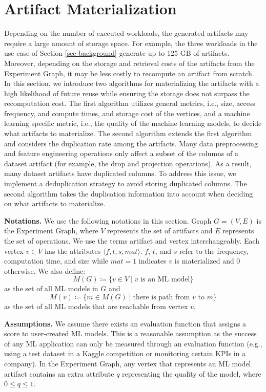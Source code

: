 \section{Artifact Materialization}\label{sec-materialization}
Depending on the number of executed workloads, the generated artifacts may require a large amount of storage space.
For example, the three workloads in the use case of Section \ref{sec-background} generate up to 125 GB of artifacts.
Moreover, depending on the storage and retrieval costs of the artifacts from the Experiment Graph, it may be less costly to recompute an artifact from scratch.
In this section, we introduce two algorithms for materializing the artifacts with a high likelihood of future reuse while ensuring the storage does not surpass the recomputation cost.
The first algorithm utilizes general metrics, i.e., size, access frequency, and compute times, and storage cost of the vertices, and a machine learning specific metric, i.e., the quality of the machine learning models, to decide what artifacts to materialize.
The second algorithm extends the first algorithm and considers the duplication rate among the artifacts.
Many data preprocessing and feature engineering operations only affect a subset of the columns of a dataset artifact (for example, the drop and projection operations).
As a result, many dataset artifacts have duplicated columns.
To address this issue, we implement a deduplication strategy to avoid storing duplicated columns.
The second algorithm takes the duplication information into account when deciding on what artifacts to materialize.

\textbf{Notations. }
We use the following notations in this section.
Graph $G = (V,E)$ is the Experiment Graph, where $V$ represents the set of artifacts and $E$ represents the set of operations.
We use the terms artifact and vertex interchangeably.
Each vertex $v \in V$ has the attributes $\langle f, t, s, mat \rangle$.
$f$, $t$, and $s$ refer to the frequency, computation time, and size while $mat=1$ indicates $v$ is materialized and $0$ otherwise.
We also define:
\[M(G) \coloneqq  \{v \in V \mid v \text{ is an ML model}\}\] as the set of all ML models in $G$ and 
\[M(v) \coloneqq  \{m \in M(G) \mid\text{there is path from } v \text{ to } m\}\] as the set of all ML models that are reachable from vertex $v$.

\textbf{Assumptions. }
We assume there exists an evaluation function that assigns a score to user-created ML models.
This is a reasonable assumption as the success of any ML application can only be measured through an evaluation function (e.g., using a test dataset in a Kaggle competition or monitoring certain KPIs in a company).
In the Experiment Graph, any vertex that represents an ML model artifact contains an extra attribute $q$ representing the quality of the model, where $0 \leq q \leq 1$.


